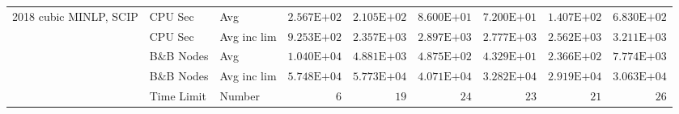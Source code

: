 \begin{table}[htbp]
{\begin{tabular}{lllrrrrrr}
\midrule
  \multirow{5}{*}{2018 cubic MINLP, SCIP} & CPU Sec & Avg & $2.567\mathrm{E}{+02}$ & $2.105\mathrm{E}{+02}$ & $8.600\mathrm{E}{+01}$ & $7.200\mathrm{E}{+01}$ & $1.407\mathrm{E}{+02}$ & $6.830\mathrm{E}{+02}$ \\
   & CPU Sec & Avg inc lim & $9.253\mathrm{E}{+02}$ & $2.357\mathrm{E}{+03}$ & $2.897\mathrm{E}{+03}$ & $2.777\mathrm{E}{+03}$ & $2.562\mathrm{E}{+03}$ & $3.211\mathrm{E}{+03}$ \\
   & B\&B Nodes & Avg & $1.040\mathrm{E}{+04}$ & $4.881\mathrm{E}{+03}$ & $4.875\mathrm{E}{+02}$ & $4.329\mathrm{E}{+01}$ & $2.366\mathrm{E}{+02}$ & $7.774\mathrm{E}{+03}$ \\
   & B\&B Nodes & Avg inc lim & $5.748\mathrm{E}{+04}$ & $5.773\mathrm{E}{+04}$ & $4.071\mathrm{E}{+04}$ & $3.282\mathrm{E}{+04}$ & $2.919\mathrm{E}{+04}$ & $3.063\mathrm{E}{+04}$ \\
   & Time Limit & Number & $6$ & $19$ & $24$ & $23$ & $21$ & $26$ \\
\bottomrule
\end{tabular}%
}
\end{table}
